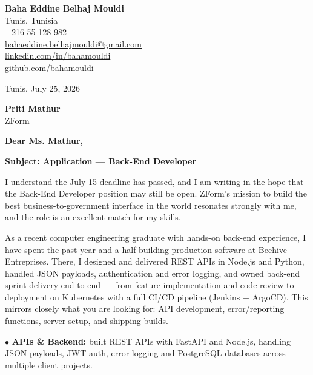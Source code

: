 \documentclass[a4paper,11pt]{article}
\begin{document}
\begin{flushright}
{\bfseries Baha Eddine Belhaj Mouldi}\\
Tunis, Tunisia\\
+216 55 128 982\\
\href{mailto:bahaeddine.belhajmouldi@gmail.com}{bahaeddine.belhajmouldi@gmail.com}\\
\href{https://linkedin.com/in/bahamouldi}{linkedin.com/in/bahamouldi}\\
\href{https://github.com/bahamouldi}{github.com/bahamouldi}
\end{flushright}

\vspace{0.8cm}

\begin{flushleft}
Tunis, July 25, 2026

\vspace{0.8cm}

{\bfseries Priti Mathur}\\
ZForm

\vspace{0.6cm}

{\bfseries Dear Ms. Mathur,}

\vspace{0.6cm}

{\bfseries Subject: Application --- Back-End Developer}
\end{flushleft}

\vspace{0.6cm}

I understand the July 15 deadline has passed, and I am writing in the hope that the Back-End Developer position may still be open. ZForm's mission to build the best business-to-government interface in the world resonates strongly with me, and the role is an excellent match for my skills.

As a recent computer engineering graduate with hands-on back-end experience, I have spent the past year and a half building production software at Beehive Entreprises. There, I designed and delivered REST APIs in Node.js and Python, handled JSON payloads, authentication and error logging, and owned back-end sprint delivery end to end --- from feature implementation and code review to deployment on Kubernetes with a full CI/CD pipeline (Jenkins + ArgoCD). This mirrors closely what you are looking for: API development, error/reporting functions, server setup, and shipping builds.

$\bullet$ \textbf{APIs \& Backend:} built REST APIs with FastAPI and Node.js, handling JSON payloads, JWT auth, error logging and PostgreSQL databases across multiple client projects.
\end{document}
